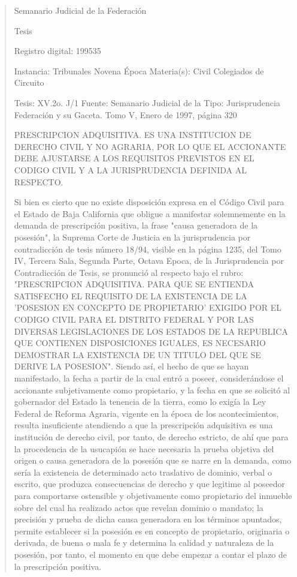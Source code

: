\documentclass[11pt,a4paper]{article}
\begin{document}
\begin{quote}
                                                   Semanario Judicial de la Federación

                                                  Tesis

 Registro digital: 199535

 Instancia: Tribunales             Novena Época                           Materia(s): Civil
 Colegiados de Circuito

 Tesis: XV.2o. J/1                 Fuente: Semanario Judicial de la  Tipo: Jurisprudencia
                                   Federación y su Gaceta.
                                   Tomo V, Enero de 1997, página 320


PRESCRIPCION ADQUISITIVA. ES UNA INSTITUCION DE DERECHO CIVIL Y NO AGRARIA,
POR LO QUE EL ACCIONANTE DEBE AJUSTARSE A LOS REQUISITOS PREVISTOS EN EL
CODIGO CIVIL Y A LA JURISPRUDENCIA DEFINIDA AL RESPECTO.


Si bien es cierto que no existe disposición expresa en el Código Civil para el Estado de Baja
California que obligue a manifestar solemnemente en la demanda de prescripción positiva, la frase
"causa generadora de la posesión", la Suprema Corte de Justicia en la jurisprudencia por
contradicción de tesis número 18/94, visible en la página 1235, del Tomo IV, Tercera Sala, Segunda
Parte, Octava Epoca, de la Jurisprudencia por Contradicción de Tesis, se pronunció al respecto bajo
el rubro: "PRESCRIPCION ADQUISITIVA. PARA QUE SE ENTIENDA SATISFECHO EL
REQUISITO DE LA EXISTENCIA DE LA 'POSESION EN CONCEPTO DE PROPIETARIO'
EXIGIDO POR EL CODIGO CIVIL PARA EL DISTRITO FEDERAL Y POR LAS DIVERSAS
LEGISLACIONES DE LOS ESTADOS DE LA REPUBLICA QUE CONTIENEN DISPOSICIONES
IGUALES, ES NECESARIO DEMOSTRAR LA EXISTENCIA DE UN TITULO DEL QUE SE DERIVE
LA POSESION". Siendo así, el hecho de que se hayan manifestado, la fecha a partir de la cual
entró a poseer, considerándose el accionante subjetivamente como propietario, y la fecha en que se
solicitó al gobernador del Estado la tenencia de la tierra, como lo exigía la Ley Federal de Reforma
Agraria, vigente en la época de los acontecimientos, resulta insuficiente atendiendo a que la
prescripción adquisitiva es una institución de derecho civil, por tanto, de derecho estricto, de ahí que
para la procedencia de la usucapión se hace necesaria la prueba objetiva del origen o causa
generadora de la posesión que se narre en la demanda, como sería la existencia de determinado
acto traslativo de dominio, verbal o escrito, que produzca consecuencias de derecho y que legitime
al poseedor para comportarse ostensible y objetivamente como propietario del inmueble sobre del
cual ha realizado actos que revelan dominio o mandato; la precisión y prueba de dicha causa
generadora en los términos apuntados, permite establecer si la posesión es en concepto de
propietario, originaria o derivada, de buena o mala fe y determina la calidad y naturaleza de la
posesión, por tanto, el momento en que debe empezar a contar el plazo de la prescripción positiva.


\end{quote}
\end{document}
